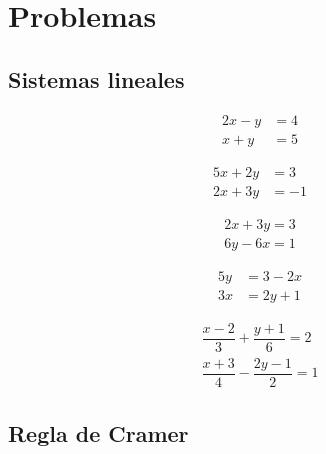 \section*{Problemas}


\subsection*{Sistemas lineales}


\begin{problema}
	\begin{align*}
		2x-y&=4\\
		x+y&=5
	\end{align*}

\end{problema}




\begin{problema}
	\begin{align*}
		5x+2y&=3\\
		2x+3y&=-1
	\end{align*}

\end{problema}




\begin{problema}
	\begin{align*}
		2x+3y=3\\
		6y-6x=1
	\end{align*}

\end{problema}




\begin{problema}
	\begin{align*}
		5y&=3-2x\\
		3x&=2y+1
	\end{align*}

\end{problema}




\begin{problema}
	\begin{align*}
		\dfrac{x-2}{3}+\dfrac{y+1}{6}=2\\
		\dfrac{x+3}{4}-\dfrac{2y-1}{2}=1
	\end{align*}

\end{problema}

\subsection*{Regla de Cramer}



